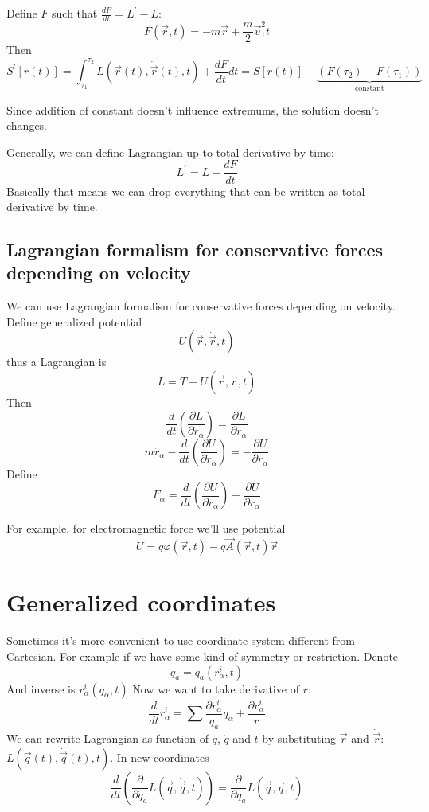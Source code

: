Define $F$ such that $\frac{dF}{dt} = L^\prime - L$:
$$F(\vec{r},t) =- m\vec{r} + \frac{m}{2}\vec{v}_1^2 t $$
Then
$$S^\prime \left[r(t)\right] = \int_{\tau_1}^{\tau_2} L(\vec{r}(t), \dot{\vec{r}}(t),t) + \frac{dF}{dt} dt =  S \left[r(t)\right] + \underbrace{\left( F(\tau_2) - F(\tau_1) \right)}_{\text{constant}}$$

Since addition of constant doesn't influence extremums, the solution doesn't changes.

Generally, we can define Lagrangian up to total derivative by time:
$$L^\prime  = L  + \frac{dF}{dt}$$
Basically that means we can drop everything that can be written as total derivative by time.
\subsection{Lagrangian formalism for conservative forces depending on velocity}
We can use Lagrangian formalism for conservative forces depending on velocity. Define generalized potential
$$U(\vec{r}, \dot{\vec{r}},t)$$
thus a Lagrangian is
$$L = T - U(\vec{r}, \dot{\vec{r}},t) $$
Then
$$\frac{d}{dt} \left( \frac{\partial L}{\partial \dot{r}_\alpha} \right) = \frac{\partial L}{\partial r_\alpha}$$
$$m\ddot{r}_\alpha - \frac{d}{dt} \left(  \frac{\partial U}{\partial \dot{r}_\alpha}  \right) = -  \frac{\partial U}{\partial r_\alpha} $$
Define
$$F_\alpha = \frac{d}{dt} \left(  \frac{\partial U}{\partial \dot{r}_\alpha}  \right)  -  \frac{\partial U}{\partial r_\alpha}$$

For example, for electromagnetic force we'll use potential
$$U = q \varphi(\vec{r},t) - q\vec{A} \left( \vec{r}, t \right) \dot{\vec{r}}$$

\section{Generalized coordinates}
Sometimes it's more convenient to use coordinate system different from Cartesian. For example if we have some kind of symmetry or restriction. Denote
$$q_a = q_a\left( r_\alpha^i, t \right)$$
And inverse is $r_\alpha^i(q_\alpha, t)$
Now we want to take derivative of $r$:
$$\frac{d}{dt} r_\alpha^i = \sum \frac{\partial  r_\alpha^i}{ q_a}\dot{q}_\alpha + \frac{\partial  r^i_\alpha}{ r}$$
We can rewrite Lagrangian as function of $q$, $\dot{q}$ and $t$ by substituting $\vec{r}$ and $\dot{\vec{r}}$: $ L(\vec{q}(t), \dot{\vec{q}}(t),t)$. In new coordinates
$$\frac{d}{dt}\left( \frac{\partial}{\partial \dot{q}_a} L(\vec{q}, \dot{\vec{q}}, t) \right) = \frac{\partial}{\partial q_a} L(\vec{q}, \dot{\vec{q}}, t) $$